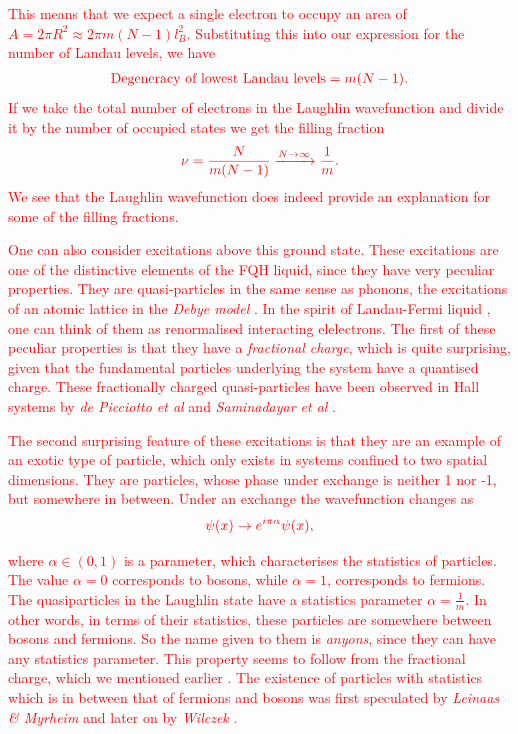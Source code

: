  \textcolor{red}{This means that we expect a single electron to occupy an area of $A= 2\pi R^2 \approx 2\pi m (N-1)l_B^2$. Substituting this into our expression for the number of Landau levels, we have}
\begin{align}
    \textcolor{red}{\text{Degeneracy of lowest Landau levels} = m(N-1). }
\end{align}
 \textcolor{red}{If we take the total number of electrons in the Laughlin wavefunction and divide it by the number of occupied states we get the filling fraction}
\begin{align}
    \textcolor{red}{\nu = \frac{N}{m (N-1)} \xrightarrow{N \rightarrow \infty} \frac{1}{m}.}
\end{align}
 \textcolor{red}{We see that the Laughlin wavefunction does indeed provide an explanation for some of the filling fractions. }

 \textcolor{red}{One can also consider excitations above this ground state. These excitations are one of the distinctive elements of the FQH liquid, since they have very peculiar properties. They are quasi-particles in the same sense as phonons, the excitations of an atomic lattice in the \textit{Debye model} \cite{Debye1912}. In the spirit of Landau-Fermi liquid \cite{Landau:1956zuh}, one can think of them as renormali\textcolor{red}{s}ed interacting elelectrons. The first of these peculiar properties is that they have a \textit{fractional charge}, which is quite surprising, given that the fundamental particles underlying the system have a quanti\textcolor{red}{s}ed charge. These fractionally charged quasi-particles have been observed in Hall systems by \textit{de Picciotto et al} and \textit{Saminadayar et al} \cite{dePicciotto:1997qc, PhysRevLett.79.2526}.}

 \textcolor{red}{The second surprising feature of these excitations is that they are an example of an exotic type of particle, which only exists in systems confined to two spatial dimensions. They are particles, whose phase under exchange is neither 1 nor -1, but somewhere in between. Under an exchange the wavefunction changes as}
\begin{align}
    \textcolor{red}{\psi(x) \rightarrow e^{ i\pi  \alpha} \psi(x),}
\end{align}

 \textcolor{red}{where $\alpha \in (0,1)$ is a parameter, which characteri\textcolor{red}{s}es the statistics of particles. The value $\alpha=0 $ corresponds to bosons, while $\alpha=1$, corresponds to fermions. The quasiparticles in the Laughlin state have a statistics parameter $\alpha = \frac{1}{m}$. In other words, in terms of their statistics, these particles are somewhere between bosons and fermions.  So the name given to them is \textit{anyons}, since they can have any statistics parameter. This property seems to follow from the fractional charge, which we mentioned earlier \cite{Halperin:1983zz, Wilczek:1981du}. The existence of particles with statistics which is in between that of fermions and bosons was first speculated by \textit{Leinaas \& Myrheim} \cite{Leinaas:1977fm} and later on by \textit{Wilczek} \cite{PhysRevLett.49.957}.}

